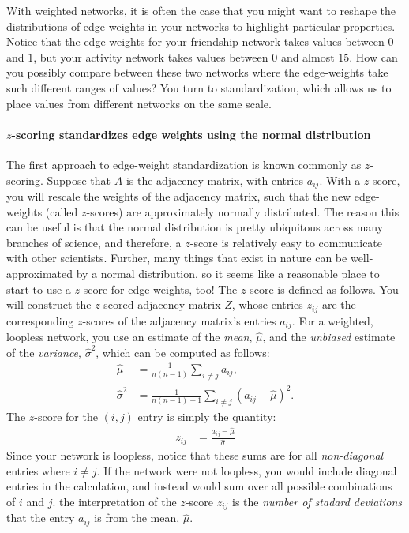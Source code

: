 With weighted networks, it is often the case that you might want to reshape the distributions of edge-weights in your networks to highlight particular properties. Notice that the edge-weights for your friendship network takes values between $0$ and $1$, but your activity network takes values between $0$ and almost $15$. How can you possibly compare between these two networks where the edge-weights take such different ranges of values? You turn to standardization, which allows us to place values from different networks on the same scale. 

\paragraph{$z$-scoring standardizes edge weights using the normal distribution}

The first approach to edge-weight standardization is known commonly as $z$-scoring. Suppose that $A$ is the adjacency matrix, with entries $a_{ij}$. With a $z$-score, you will rescale the weights of the adjacency matrix, such that the new edge-weights (called $z$-scores) are approximately normally distributed. The reason this can be useful is that the normal distribution is pretty ubiquitous across many branches of science, and therefore, a $z$-score is relatively easy to communicate with other scientists. Further, many things that exist in nature can be well-approximated by a normal distribution, so it seems like a reasonable place to start to use a $z$-score for edge-weights, too! The $z$-score is defined as follows. You will construct the $z$-scored adjacency matrix $Z$, whose entries $z_{ij}$ are the corresponding $z$-scores of the adjacency matrix's entries $a_{ij}$. For a weighted, loopless network, you use an estimate of the \emph{mean}, $\hat \mu$, and the \emph{unbiased} estimate of the \emph{variance}, $\hat \sigma^2$, which can be computed as follows:
\begin{align*}
    \hat\mu &= \frac{1}{n(n-1)}\sum_{i \neq j}a_{ij},\\
    \hat\sigma^2 &= \frac{1}{n(n - 1) - 1}\sum_{i \neq j} (a_{ij} - \hat\mu)^2.
\end{align*}
The $z$-score for the $(i,j)$ entry is simply the quantity:
\begin{align*}
    z_{ij} &= \frac{a_{ij} - \hat\mu}{\hat\sigma}
\end{align*}
Since your network is loopless, notice that these sums are for all \emph{non-diagonal} entries where $i \neq j$. If the network were not loopless, you would include diagonal entries in the calculation, and instead would sum over all possible combinations of $i$ and $j$. the interpretation of the $z$-score $z_{ij}$ is the \emph{number of stadard deviations} that the entry $a_{ij}$ is from the mean, $\hat \mu$.


